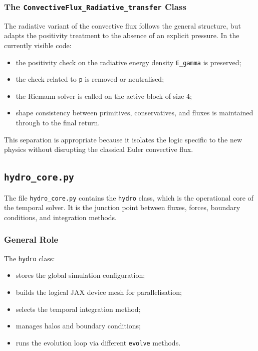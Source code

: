 \documentclass[a4paper, 11pt]{article}
\begin{document}
\subsubsection*{The \texttt{ConvectiveFlux\_Radiative\_transfer} Class}
The radiative variant of the convective flux follows the general structure, but adapts the positivity treatment to the absence of an explicit pressure. In the currently visible code:
\begin{itemize}
    \item the positivity check on the radiative energy density \texttt{E\_gamma} is preserved;
    \item the check related to \texttt{p} is removed or neutralised;
    \item the Riemann solver is called on the active block of size 4;
    \item shape consistency between primitives, conservatives, and fluxes is maintained through to the final return.
\end{itemize}

This separation is appropriate because it isolates the logic specific to the new physics without disrupting the classical Euler convective flux.

\subsection{\texttt{hydro\_core.py}}
The file \texttt{hydro\_core.py} contains the \texttt{hydro} class, which is the operational core of the temporal solver. It is the junction point between fluxes, forces, boundary conditions, and integration methods.

\subsubsection*{General Role}
The \texttt{hydro} class:
\begin{itemize}
    \item stores the global simulation configuration;
    \item builds the logical JAX device mesh for parallelisation;
    \item selects the temporal integration method;
    \item manages halos and boundary conditions;
    \item runs the evolution loop via different \texttt{evolve} methods.
\end{itemize}
\end{document}

